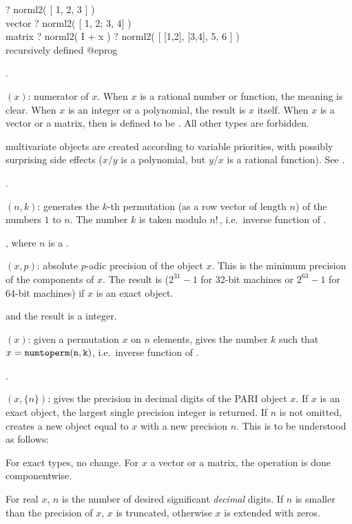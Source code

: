 \bprog
? norml2( [ 1, 2, 3 ] )      \\ vector
? norml2( [ 1, 2; 3, 4] )   \\ matrix
? norml2( I + x )
? norml2( [ [1,2], [3,4], 5, 6 ] )   \\ recursively defined
@eprog

.

$(x)$: numerator of $x$. When $x$ is a rational number
or function, the meaning is clear. When $x$ is an integer or a polynomial,
the result is $x$ itself. When $x$ is a vector or a matrix, then
 is defined to be . All other types
are forbidden.

 multivariate objects are created according to variable
priorities, with possibly surprising side effects ($x/y$ is a polynomial, but
$y/x$ is a rational function). See .

.

$(n,k)$: generates the $k$-th permutation (as a
row vector of length $n$) of the numbers $1$ to $n$. The number $k$ is taken
modulo $n!\,$, i.e.~inverse function of .

, where $n$ is a .

$(x,p)$: absolute $p$-adic precision of the object $x$.
This is the minimum precision of the components of $x$. The result is
 ($2^{31}-1$ for 32-bit machines or $2^{63}-1$ for 64-bit
machines) if $x$ is an exact object.

 and the result is a 
integer.

$(x)$: given a permutation $x$ on $n$ elements,
gives the number $k$ such that $x={\tt numtoperm(n,k)}$, i.e.~inverse
function of .

.

$(x,\{n\})$: gives the precision in decimal digits of the
PARI object $x$. If $x$ is an exact object, the largest single precision
integer is returned. If $n$ is not omitted, creates a new object equal to $x$
with a new precision $n$. This is to be understood as follows:

For exact types, no change. For $x$ a vector or a matrix, the operation
is done componentwise.

For real $x$, $n$ is the number of desired significant \emph{decimal} digits.
If $n$ is smaller than the precision of $x$, $x$ is truncated, otherwise $x$
is extended with zeros.

